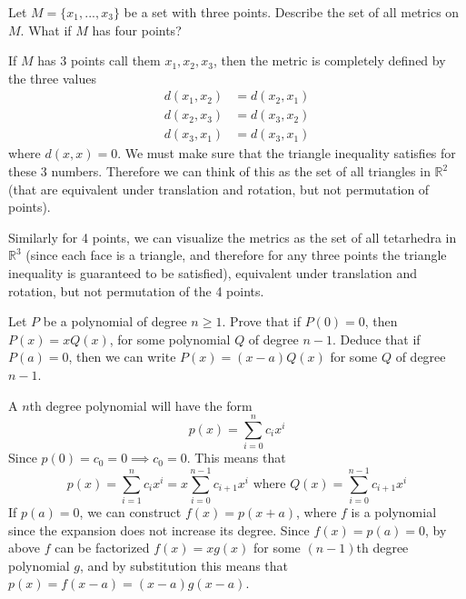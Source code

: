  \begin{exercise}
    Let $M = \{x_1,..., x_3\}$ be a set with three points. Describe the set of all metrics on $M$. What if $M$ has four points?
  \end{exercise} 
  \begin{solution}
    If $M$ has 3 points call them $x_1, x_2, x_3$, then the metric is completely defined by the three values 
    \begin{align}
      d(x_1, x_2) & = d(x_2, x_1) \\
      d(x_2, x_3) & = d(x_3, x_2) \\
      d(x_3, x_1) & = d(x_3, x_1) 
    \end{align}
    where $d(x, x) = 0$. We must make sure that the triangle inequality satisfies for these 3 numbers. Therefore we can think of this as the set of all triangles in $\mathbb{R}^2$ (that are equivalent under translation and rotation, but not permutation of points). 

    Similarly for 4 points, we can visualize the metrics as the set of all tetarhedra in $\mathbb{R}^3$ (since each face is a triangle, and therefore for any three points the triangle inequality is guaranteed to be satisfied), equivalent under translation and rotation, but not permutation of the 4 points. 
  \end{solution}

  \begin{exercise}
    Let $P$ be a polynomial of degree $n \geq 1$. Prove that if $P(0) = 0$, then $P(x) = xQ(x)$, for some polynomial $Q$ of degree $n-1$. Deduce that if $P(a) = 0$, then we can write $P(x) = (x-a)Q(x)$ for some $Q$ of degree $n-1$.
  \end{exercise}
  \begin{solution}
    A $n$th degree polynomial will have the form 
    \begin{equation}
      p(x) = \sum_{i=0}^n c_i x^i
    \end{equation}
    Since $p(0) = c_0 = 0 \implies c_0 = 0$. This means that 
    \begin{equation}
      p(x) = \sum_{i=1}^n c_i x^i = x \sum_{i=0}^{n-1} c_{i+1} x^i \text{ where } Q(x) = \sum_{i=0}^{n-1} c_{i+1} x^i
    \end{equation} 
    If $p(a) = 0$, we can construct $f(x) = p(x + a)$, where $f$ is a polynomial since the expansion does not increase its degree. Since $f(x) = p(a) = 0$, by above $f$ can be factorized $f(x) = x g(x)$ for some $(n-1)$th degree polynomial $g$, and by substitution this means that $p(x) = f(x - a) = (x - a) g(x - a)$. 
  \end{solution}

